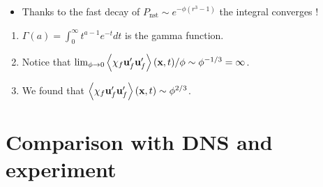 \documentclass{sintefbeamer}
\begin{document}
\begin{frame}
\begin{itemize}
    \item Thanks to the fast decay of $P_\text{nst} \sim e^{-\phi (r^3-1)}$ the integral converges ! 
  \end{itemize}
  \begin{enumerate}
    \item $\Gamma(a) = \int_0^\infty t^{a-1} e^{-t} dt $ is the gamma  function. 
    \item  Notice that $\lim_{\phi \to 0} \left<\chi_f \textbf{u}'_f\textbf{u}'_f\right>(\textbf{x},t)/\phi \sim\phi^{-1/3} =\infty$. 
    \item We found that $\left<\chi_f \textbf{u}'_f\textbf{u}'_f\right>(\textbf{x},t)\sim\phi^{2/3}$.  
  \end{enumerate}
    
\end{frame}

\section{Comparison with DNS and experiment}
\end{document}
